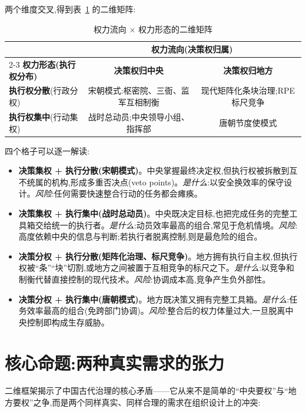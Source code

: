 \documentclass[UTF8,12pt,a4paper]{ctexrep}
\begin{document}
两个维度交叉,得到表~\ref{tab:matrix} 的二维矩阵:

\begin{table}[htbp]
  \centering
  \small
  \caption{权力流向 $\times$ 权力形态的二维矩阵}
  \label{tab:matrix}
  \begin{tabularx}{\linewidth}{@{}Xcc@{}}
    \toprule
    & \multicolumn{2}{c}{\textbf{权力流向(决策权归属)}} \\
    \cmidrule(lr){2-3}
    \textbf{权力形态(执行权分布)} & \textbf{决策权归中央} & \textbf{决策权归地方} \\
    \midrule
    \textbf{执行权分散}(行政分权) & 宋朝模式:枢密院、三衙、监军互相制衡 & 现代矩阵化条块治理;RPE 标尺竞争 \\
    \textbf{执行权集中}(行动集权) & 战时总动员;中央领导小组、指挥部 & 唐朝节度使模式 \\
    \bottomrule
  \end{tabularx}
\end{table}

四个格子可以逐一解读:

\begin{itemize}
  \item \textbf{决策集权 + 执行分散(宋朝模式)}。中央掌握最终决定权,但执行权被拆散到互不统属的机构,形成多重否决点(veto points)。\emph{是什么}:以安全换效率的保守设计。\emph{风险}:任何需要快速整合行动的任务都会瘫痪。
  \item \textbf{决策集权 + 执行集中(战时总动员)}。中央既决定目标,也把完成任务的完整工具箱交给统一的执行者。\emph{是什么}:动员效率最高的组合,常见于危机情境。\emph{风险}:高度依赖中央的信息与判断;若执行者脱离控制,则是最危险的组合。
  \item \textbf{决策分权 + 执行分散(矩阵化治理、标尺竞争)}。地方拥有执行自主权,但执行权被``条''``块''切割,或地方之间被置于互相竞争的标尺之下。\emph{是什么}:以竞争和制衡代替直接控制的现代技术。\emph{风险}:协调成本高,竞争产生负外部性。
  \item \textbf{决策分权 + 执行集中(唐朝模式)}。地方既决策又拥有完整工具箱。\emph{是什么}:任务效率最高的组合(免跨部门协调)。\emph{风险}:整合后的权力体量过大,一旦脱离中央控制即构成生存威胁。
\end{itemize}

\section{核心命题:两种真实需求的张力}

二维框架揭示了中国古代治理的核心矛盾——它从来不是简单的``中央要权''与``地方要权''之争,而是两个同样真实、同样合理的需求在组织设计上的冲突:
\end{document}
